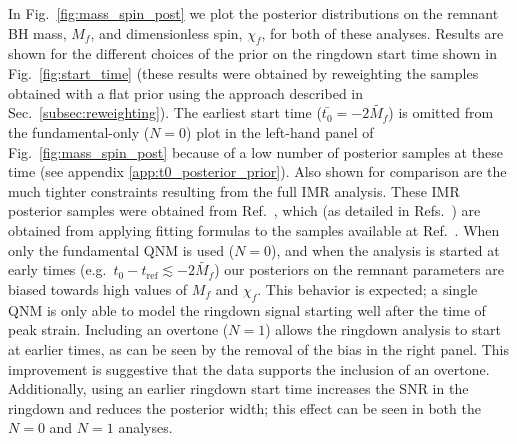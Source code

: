In Fig.~\ref{fig:mass_spin_post} we plot the posterior distributions on the remnant BH mass, $M_f$, and dimensionless spin, $\chi_f$, for both of these analyses.
Results are shown for the different choices of the prior on the ringdown start time shown in Fig.~\ref{fig:start_time} (these results were obtained by reweighting the samples obtained with a flat prior using the approach described in Sec.~\ref{subsec:reweighting}).
The earliest start time ($\bar{t_0}=-2\tilde{M_f}$) is omitted from the fundamental-only ($N=0$) plot in the left-hand panel of Fig.~\ref{fig:mass_spin_post} because of a low number of posterior samples at these time (see appendix \ref{app:t0_posterior_prior}).
Also shown for comparison are the much tighter constraints resulting from the full IMR analysis.
These IMR posterior samples were obtained from Ref.~\cite{maximiliano_isi_2022_5965773}, which (as detailed in Refs.~\cite{Isi:2019aib,Isi:2022mhy}) are obtained from applying fitting formulas to the samples available at Ref.~\cite{gwtc1samples}. 
When only the fundamental QNM is used ($N=0$), and when the analysis is started at early times (e.g.\ $t_0 - t_\mathrm{ref}\lesssim -2\tilde{M_f}$) our posteriors on the remnant parameters are biased towards high values of $M_f$ and $\chi_f$.
This behavior is expected; a single QNM is only able to model the ringdown signal starting well after the time of peak strain.
Including an overtone ($N=1$) allows the ringdown analysis to start at earlier times, as can be seen by the removal of the bias in the right panel. 
This improvement is suggestive that the data supports the inclusion of an overtone.
Additionally, using an earlier ringdown start time increases the SNR in the ringdown and reduces the posterior width; this effect can be seen in both the $N=0$ and $N=1$ analyses.

